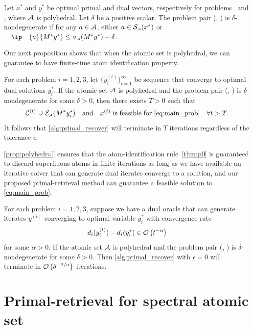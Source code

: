 \begin{definition}
    Let $x^*$ and $y^*$ be optimal primal and dual vectors, respectively for
    problems \Probi\ and \Drobi, where $\mathcal{A}$ is polyhedral. Let $\delta$ be a positive scalar. 
    The problem pair (\Probi, \Drobi) is $\delta$-nondegenerate if for any $a\in\mathcal{A}$, either $a\in\operatorname{\mathcal{S}_{\scriptscriptstyle\mathcal{A}}}(x^*)$ or $\ip{a}{M^*y^*} \leq \sigma\As(M^*y^*) - \delta$. 
\end{definition}

Our next proposition shows that when the atomic set is polyhedral, we can guarantee to have finite-time atom identification property. 

\begin{proposition} \label{prop:polyhedral} For each problem $i
    = 1, 2, 3$, let $\{y_i^{(t)}\}_{t=1}^\infty$
    be sequence that converge to optimal dual solutions $
    y_i^*$. If the atomic set $\mathcal{A}$ is polyhedral and the problem pair (\Probi, \Drobi) is $\delta$-nondegenerate for some $\delta > 0$,
    then there exists
    $T > 0$ such that 
    \[\mathcal{C}^{(t)} \supseteq \mathcal{E}_{\scriptscriptstyle\mathcal{A}}( M^* y_i^*) 
    \hbox{\quad and\quad}
    x^{(t)} \mbox{ is feasible for } \eqref{eq:main_prob} 
    \quad \forall t>T.\]
    It follows that \autoref{alg:primal_recover} will terminate in $T$ iterations regardless of the tolerance $\epsilon$. 
\end{proposition}

\autoref{prop:polyhedral} ensures that the atom-identification rule~\autoref{thm:p0} is guaranteed to discard superfluous atoms in finite iterations as long as we have available an iterative solver that can generate dual iterates converge to a solution, and  our proposed primal-retrieval method can guarantee a feasible solution to \eqref{eq:main_prob}. 

\begin{corollary} \label{coro:polyhedral}
    For each problem $i= 1, 2, 3$, suppose we have a dual oracle that can generate iterates $y^{(t)}$ converging to optimal variable $y_i^*$ with convergence rate
    \[d_i(y_i^{(t)}) - d_i(y_i^*) \in \mathcal{O}\left( t^{-\alpha} \right)\]
    for some $\alpha > 0$. If the atomic set $\mathcal{A}$ is polyhedral and the problem pair (\Probi, \Drobi) is $\delta$-nondegenerate for some $\delta > 0$. Then \autoref{alg:primal_recover} with $\epsilon=0$ will terminate in $\mathcal{O}\left(\delta^{-2/\alpha}\right)$ iterations. 
\end{corollary}

\section{Primal-retrieval for spectral atomic set} \label{sec:spectral}

